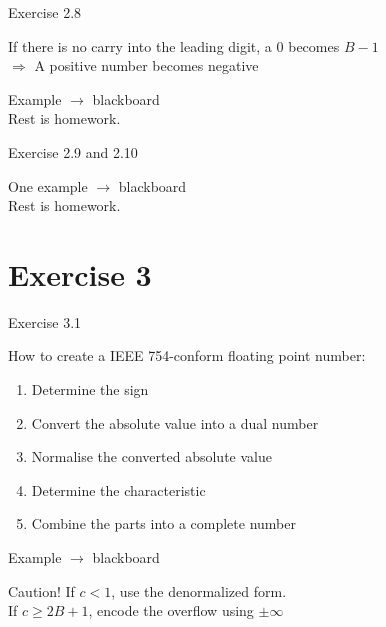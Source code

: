 \documentclass[11pt]{tudbeamer}
\begin{document}
\begin{frame}{Exercise 2.8}

	If there is no carry into the leading digit, a $0$ becomes $B-1$ \\
	$\Rightarrow$ A positive number becomes negative 

	Example $\rightarrow$ blackboard \\
	Rest is homework.

\end{frame}

\begin{frame}{Exercise 2.9 and 2.10}

	One example $\rightarrow$ blackboard \\
	Rest is homework.

\end{frame}

\section{Exercise 3}

\begin{frame}[allowframebreaks]{Exercise 3.1}

	How to create a IEEE 754-conform floating point number:

	\begin{enumerate}
		\item Determine the sign
		\item Convert the absolute value into a dual number
		\item Normalise the converted absolute value
		\item Determine the characteristic
		\item Combine the parts into a complete number
	\end{enumerate}

\framebreak

	Example $\rightarrow$ blackboard \\
	
	\begin{block}{Caution!}
	If $c < 1$, use the denormalized form.\\
	If $c \geq 2B+1$, encode the overflow using $\pm\infty$
	\end{block}

\end{frame}
\end{document}

